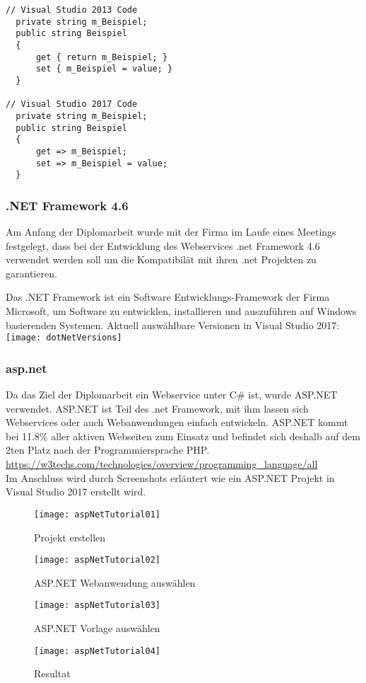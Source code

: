 \begin{lstlisting}[caption=Syntax Unterschied: Property , label=lst:test]
// Visual Studio 2013 Code
  private string m_Beispiel;
  public string Beispiel
  {
      get { return m_Beispiel; }
      set { m_Beispiel = value; }
  }

// Visual Studio 2017 Code
  private string m_Beispiel;
  public string Beispiel
  {
      get => m_Beispiel;
      set => m_Beispiel = value;
  }
\end{lstlisting}

\subsubsection {.NET Framework 4.6}
Am Anfang der Diplomarbeit wurde mit der Firma im Laufe eines Meetings festgelegt, dass bei der Entwicklung des Webservices .net Framework 4.6 verwendet werden soll um die Kompatibilät mit ihren .net Projekten zu garantieren.
\raggedright
Das .NET Framework ist ein Software Entwicklungs-Framework der Firma Microsoft, um Software zu entwicklen, installieren und auszuführen auf Windows basierenden Systemen. 
Aktuell auswählbare Versionen in Visual Studio 2017:\\ 

\centering
\texttt{[image: dotNetVersions]}


\raggedright
\subsubsection {asp.net}
Da das Ziel der Diplomarbeit ein Webservice unter C\# ist, wurde ASP.NET verwendet. ASP.NET ist Teil des .net Framework, mit ihm lassen sich Webservices oder auch Webanwendungen einfach entwickeln. ASP.NET kommt bei 11.8\% aller aktiven Webseiten zum Einsatz und befindet sich deshalb auf dem 2ten Platz nach der Programmiersprache PHP. 
\url {https://w3techs.com/technologies/overview/programming_language/all} 
\\
Im Anschluss wird durch Screenshots erläutert wie ein ASP.NET Projekt in Visual Studio 2017 erstellt wird.

\begin{figure}[H]
    \centering
    \texttt{[image: aspNetTutorial01]}
    \caption{Projekt erstellen}
    \label{fig:aspNetTut01}

    \centering
    \texttt{[image: aspNetTutorial02]}
    \caption{ASP.NET Webanwendung auswählen}
    \label{fig:aspNetTut02}
\end{figure}
\begin{figure}[H]
    \centering
    \texttt{[image: aspNetTutorial03]}
    \caption{ASP.NET Vorlage auswählen}
    \label{fig:aspNetTut03}
    \centering
    \texttt{[image: aspNetTutorial04]}
    \caption{Resultat}
    \label{fig:aspNetTut04}
\end{figure}


